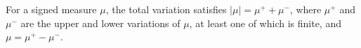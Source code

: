 For a signed measure $\mu$, the total variation satisfies $|\mu| = \mu^+ + \mu^-$, where $\mu^+$ and $\mu^-$ are the upper and lower variations of $\mu$, at least one of which is finite, and $\mu = \mu^+ - \mu^-$.
